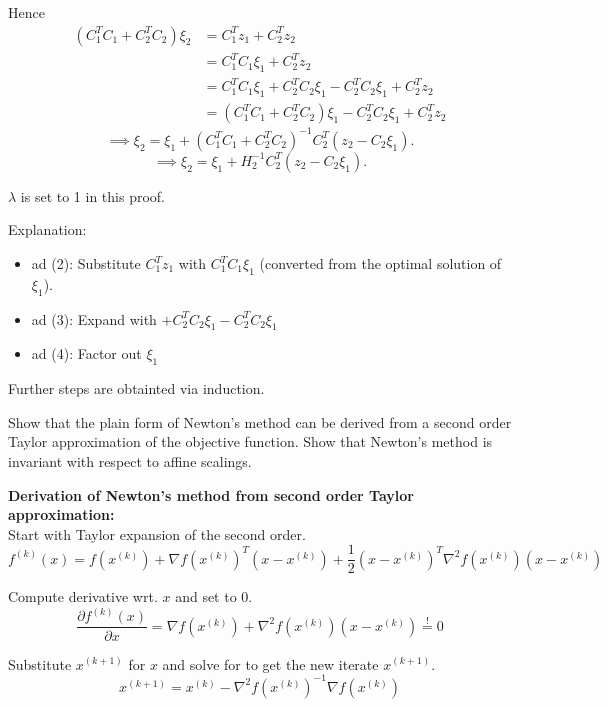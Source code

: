\documentclass[12pt,a4paper]{article}
\begin{document}
Hence
\begin{align}
  (C_1^TC_1+C_2^TC_2)\xi_2 &= C_1^Tz_1+C_2^Tz_2 \\
                           &= C_1^TC_1\xi_1+C_2^Tz_2 \\
                           &= C_1^TC_1 \xi_1 + C_2^TC_2 \xi_1 - C_2^TC_2\xi_1 + C_2^Tz_2\\
                           &= (C_1^TC_1+C_2^TC_2)\xi_1-C_2^TC_2\xi_1+C_2^Tz_2
\end{align}
$$\implies \xi_2 = \xi_1 + (C_1^TC_1+C_2^TC_2)^{-1}C_2^T(z_2-C_2\xi_1).$$
$$\implies \xi_2 = \xi_1 + H_2^{-1}C_2^T(z_2-C_2\xi_1).$$

$\lambda$ is set to 1 in this proof.

Explanation:
\begin{itemize}
    \item ad (2): Substitute $C_1^Tz_1$ with $C_1^T C_1 \xi_1$ (converted from the optimal solution of $\xi_1$).
    \item ad (3): Expand with $+ C^T_2 C_2 \xi_1 - C^T_2 C_2 \xi_1$
    \item ad (4): Factor out $\xi_1$
\end{itemize}

Further steps are obtainted via induction.

\begin{question}
Show that the plain form of Newton's method can be derived from a second order Taylor approximation of the objective function. Show that Newton's method is invariant with respect to affine scalings.
\end{question}

\textbf{Derivation of Newton's method from second order Taylor approximation:}\\
Start with Taylor expansion of the second order.
\begin{equation*}
    f^{(k)}(x) = f(x^{(k)}) + \nabla f(x^{(k)})^T(x-x^{(k)}) + \frac{1}{2}(x-x^{(k)})^T \nabla^2 f(x^{(k)})(x-x^{(k)})
\end{equation*}

Compute derivative wrt. $x$ and set to $0$.
\begin{equation*}
    \frac{\partial f^{(k)}(x)}{\partial x}=\nabla f(x^{(k)}) + \nabla^2 f(x^{(k)})(x-x^{(k)}) \overset{!}{=} 0
\end{equation*}

Substitute $x^{(k+1)}$ for $x$ and solve for to get the new iterate $x^{(k+1)}$.
\begin{equation*}
    x^{(k+1)} = x^{(k)} - \nabla^2 f(x^{(k)})^{-1} \nabla f(x^{(k)})
\end{equation*}
\end{document}
